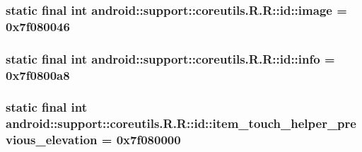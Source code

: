 \hypertarget{classandroid_1_1support_1_1coreutils_1_1_r_1_1id_45f3dad88a3a94304f99c1464c363c1f}{
\subsubsection[{image}]{\setlength{\rightskip}{0pt plus 5cm}static final int android::support::coreutils.R.R::id::image = 0x7f080046}}
\label{classandroid_1_1support_1_1coreutils_1_1_r_1_1id_45f3dad88a3a94304f99c1464c363c1f}


\hypertarget{classandroid_1_1support_1_1coreutils_1_1_r_1_1id_37fe7871b6c3c339ca383c49bba61f7c}{
\subsubsection[{info}]{\setlength{\rightskip}{0pt plus 5cm}static final int android::support::coreutils.R.R::id::info = 0x7f0800a8}}
\label{classandroid_1_1support_1_1coreutils_1_1_r_1_1id_37fe7871b6c3c339ca383c49bba61f7c}


\hypertarget{classandroid_1_1support_1_1coreutils_1_1_r_1_1id_db543b7845996ed252c328f3e6b8cb21}{
\subsubsection[{item\_\-touch\_\-helper\_\-previous\_\-elevation}]{\setlength{\rightskip}{0pt plus 5cm}static final int android::support::coreutils.R.R::id::item\_\-touch\_\-helper\_\-previous\_\-elevation = 0x7f080000}}
\label{classandroid_1_1support_1_1coreutils_1_1_r_1_1id_db543b7845996ed252c328f3e6b8cb21}


